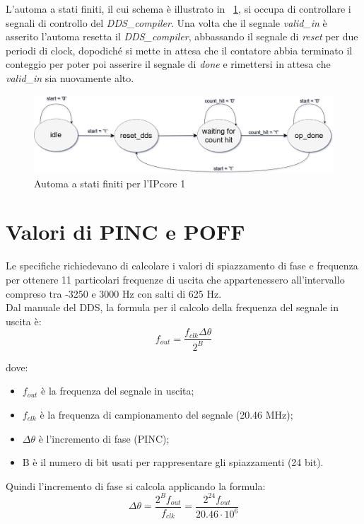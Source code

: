 \documentclass[12pt,a4paper,twoside,openany]{book}
\begin{document}
\clearpage
L'automa a stati finiti, il cui schema è illustrato in \figurename~\ref{ipcore1_fsm}, si occupa di controllare i segnali di controllo del \textit{DDS\_compiler}. Una volta che il segnale \textit{valid\_in} è asserito l'automa resetta il \textit{DDS\_compiler}, abbassando il segnale di \textit{reset} per due periodi di clock, dopodiché si mette in attesa che il contatore abbia terminato il conteggio per poter poi asserire il segnale di \textit{done} e rimettersi in attesa che \textit{valid\_in} sia nuovamente alto.

\begin{figure}
\begin{center}
\includegraphics[scale=0.35, keepaspectratio]{immagini/fsm_ipcore1}
\caption{Automa a stati finiti per l'IPcore 1}
\label{ipcore1_fsm}
\end{center}
\end{figure}

\section{Valori di PINC e POFF}
Le specifiche richiedevano di calcolare i valori di spiazzamento di fase e frequenza per ottenere 11 particolari frequenze di uscita che appartenessero all'intervallo compreso tra -3250 e 3000 Hz con salti di 625 Hz. \\
Dal manuale del DDS, la formula per il calcolo della frequenza del segnale in uscita è:
$$
	f_{out} = \frac{f_{clk} \Delta \theta}{2^{B}}
$$

dove:
\begin{itemize}
\item $f_{out}$ è la frequenza del segnale in uscita;
\item $f_{clk}$ è la frequenza di campionamento del segnale (20.46 MHz);
\item $\Delta \theta$ è l'incremento di fase (PINC);
\item B è il numero di bit usati per rappresentare gli spiazzamenti (24 bit).
\end{itemize}

Quindi l'incremento di fase si calcola applicando la formula:
$$
	\Delta \theta = \frac{2^B f_{out}}{f_{clk}} = \frac{2^{24} f_{out}}{20.46 \cdot 10^6}
$$
\end{document}
